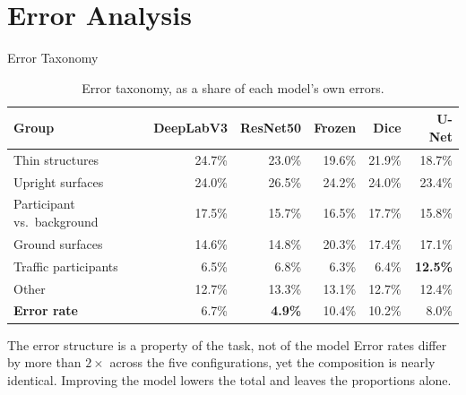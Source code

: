 
\section{Error Analysis}

\begin{frame}{Error Taxonomy}
\small
\begin{table}
\centering
\caption{Error taxonomy, as a share of each model's own errors.}
\label{tab:errors}
\scriptsize
\begin{tabular}{lrrrrr}
\toprule
\textbf{Group} & \textbf{DeepLabV3} & \textbf{ResNet50} & \textbf{Frozen} & \textbf{Dice} & \textbf{U-Net} \\
\midrule
Thin structures             & 24.7\% & 23.0\% & 19.6\% & 21.9\% & 18.7\% \\
Upright surfaces            & 24.0\% & 26.5\% & 24.2\% & 24.0\% & 23.4\% \\
Participant vs.\ background & 17.5\% & 15.7\% & 16.5\% & 17.7\% & 15.8\% \\
Ground surfaces             & 14.6\% & 14.8\% & 20.3\% & 17.4\% & 17.1\% \\
Traffic participants        &  6.5\% &  6.8\% &  6.3\% &  6.4\% & \textbf{12.5\%} \\
Other                       & 12.7\% & 13.3\% & 13.1\% & 12.7\% & 12.4\% \\
\midrule
\textbf{Error rate} & 6.7\% & \textbf{4.9\%} & 10.4\% & 10.2\% & 8.0\% \\
\bottomrule
\end{tabular}
\end{table}

\vspace{-0.15cm}
\begin{block}{The error structure is a property of the task, not of the model}
Error rates differ by more than $2\times$ across the five configurations, yet the composition is
nearly identical. Improving the model lowers the total and leaves the proportions alone.
\end{block}
\end{frame}


